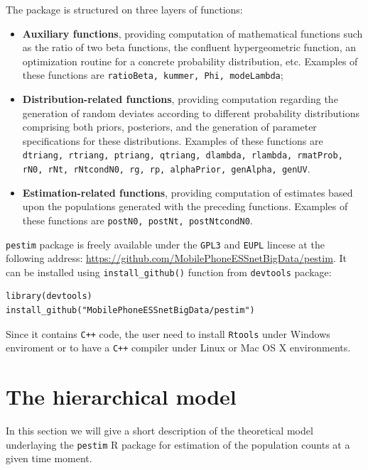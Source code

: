 \documentclass[12pt, a4paper]{article}
\begin{document}
The package is structured on three layers of functions:
\begin{itemize}
	\item \textbf{Auxiliary functions}, providing computation of mathematical functions 
such as the ratio of two beta functions, the confluent hypergeometric function, 
an optimization routine for a concrete probability distribution, etc. 
Examples of these functions are \texttt{ratioBeta, kummer, Phi, modeLambda};
	\item \textbf{Distribution-related functions}, providing computation regarding
the generation of random deviates according to different probability distributions 
comprising both priors, posteriors, and the generation of parameter specifications 
for these distributions. Examples of these functions are 
\texttt{dtriang, rtriang, ptriang, qtriang, dlambda, rlambda, rmatProb, rN0, rNt, rNtcondN0, rg, rp, alphaPrior, genAlpha, genUV}.
\item \textbf{Estimation-related functions}, providing computation of estimates 
based upon the populations generated with the preceding functions. 
Examples of these functions are \texttt{postN0, postNt, postNtcondN0}.
\end{itemize}

\texttt{pestim} package is freely available under the \texttt{GPL3} and \texttt{EUPL} lincese 
at the following address: \url{https://github.com/MobilePhoneESSnetBigData/pestim}. 
It can be installed using \texttt{install\_github()} function from \texttt{devtools} package:
\begin{verbatim}
library(devtools)
install_github("MobilePhoneESSnetBigData/pestim")
\end{verbatim}

Since it contains \texttt{C++} code, the user need to install \texttt{Rtools} under Windows 
enviroment or to have a  \texttt{C++}  compiler under Linux or Mac OS X environments.

\section{The hierarchical model}\label{model}

In this section we will give a short description of the theoretical model 
underlaying the \texttt{pestim} R package for estimation of the population 
counts at a given time moment.
\end{document}
